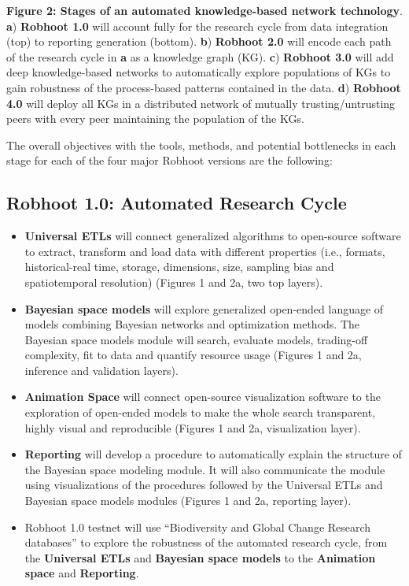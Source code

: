 \documentclass[10pt, a4paper, twocolumn]{article} %
\begin{document}
{  %
  {\small {\bf Figure 2: Stages of an automated knowledge-based
      network technology}. {\bf a}) {\bf Robhoot 1.0} will account
    fully for the research cycle from data integration (top) to
    reporting generation (bottom). {\bf b}) {\bf Robhoot 2.0} will
    encode each path of the research cycle in {\bf a} as a knowledge
    graph (KG). {\bf c}) {\bf Robhoot 3.0} will add deep
    knowledge-based networks to automatically explore populations of
    KGs to gain robustness of the process-based patterns contained in
    the data. {\bf d}) {\bf Robhoot 4.0} will deploy all KGs in a
    distributed network of mutually trusting/untrusting peers with
    every peer maintaining the population of the KGs.}
  
  The overall objectives with the tools, methods, and potential
  bottlenecks in each stage for each of the four major Robhoot
  versions are the following: \vspace{-0.15 in}
  \subsection{Robhoot 1.0: Automated Research Cycle}
   \begin{itemize}
   \item {\bf Universal ETLs} will connect generalized algorithms to
     open-source software to extract, transform and load data with
     different properties (i.e., formats, historical-real time,
     storage, dimensions, size, sampling bias and spatiotemporal
     resolution) (Figures 1 and 2a, two top layers).
   \item {\bf Bayesian space models} will explore generalized
     open-ended language of models combining Bayesian networks and
     optimization methods. The Bayesian space models module will
     search, evaluate models, trading-off complexity, fit to data and
     quantify resource usage (Figures 1 and 2a, inference and
     validation layers).
   \item {\bf Animation Space} will connect open-source visualization
     software to the exploration of open-ended models to make the
     whole search transparent, highly visual and reproducible (Figures
     1 and 2a, visualization layer).
   \item {\bf Reporting} will develop a procedure to automatically
     explain the structure of the Bayesian space modeling module. It
     will also communicate the module using visualizations of the
     procedures followed by the Universal ETLs and Bayesian space
     models modules (Figures 1 and 2a, reporting layer).
   \item Robhoot 1.0 testnet will use ``Biodiversity and Global Change
     Research databases'' to explore the robustness of the automated
     research cycle, from the {\bf Universal ETLs} and {\bf Bayesian
       space models} to the {\bf Animation space} and {\bf
       Reporting}.
   \end{itemize}

}
\end{document}
